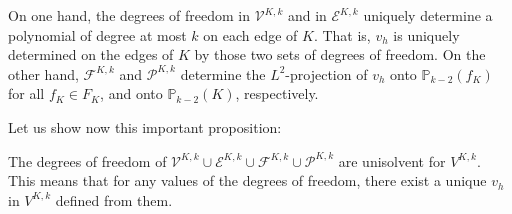 \begin{remark}\label{existvhfromdof}
On one hand, the degrees of freedom in $\mathcal{V}^{K,k}$ and in $\mathcal{E}^{K,k}$ uniquely determine a polynomial of degree at most $k$ on each edge of $K$. That is, $v_h$ is uniquely determined on the edges of $K$ by those two sets of degrees of freedom. On the other hand, $\mathcal{F}^{K,k}$ and $\mathcal{P}^{K,k}$ determine the $L^2$-projection of $v_h$ onto $\mathbb{P}_{k-2}(f_K)$ for all $f_K \in F_K$, and onto $\mathbb{P}_{k-2}(K)$, respectively. 
\end{remark}

Let us show now this important proposition:
\begin{proposition} \label{localunisolvent}
The degrees of freedom of $\mathcal{V}^{K,k}\cup\mathcal{E}^{K,k}\cup \mathcal{F}^{K,k}\cup\mathcal{P}^{K,k}$ are unisolvent for $V^{K,k}$. This means that for any values of the degrees of freedom, there exist a unique $v_h$ in $V^{K,k}$ defined from them. 
\end{proposition}
